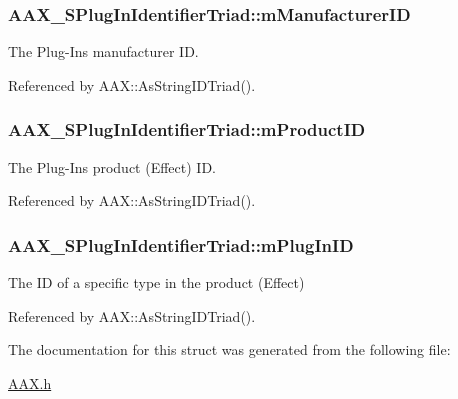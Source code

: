 \subsubsection[{m\+Manufacturer\+I\+D}]{ A\+A\+X\+\_\+\+S\+Plug\+In\+Identifier\+Triad\+::m\+Manufacturer\+I\+D}\label{a00127_a996b416626b2bb8bec10294b63579d91}


The Plug-\/\+In\textquotesingle{}s manufacturer I\+D. 



Referenced by A\+A\+X\+::\+As\+String\+I\+D\+Triad().

\hypertarget{a00127_a68e6bc6c424a7eabe04d52fe47c2a006}{}
\subsubsection[{m\+Product\+I\+D}]{ A\+A\+X\+\_\+\+S\+Plug\+In\+Identifier\+Triad\+::m\+Product\+I\+D}\label{a00127_a68e6bc6c424a7eabe04d52fe47c2a006}


The Plug-\/\+In\textquotesingle{}s product (Effect) I\+D. 



Referenced by A\+A\+X\+::\+As\+String\+I\+D\+Triad().

\hypertarget{a00127_a7554a514df9e97e8a7c8e416165f2f59}{}
\subsubsection[{m\+Plug\+In\+I\+D}]{ A\+A\+X\+\_\+\+S\+Plug\+In\+Identifier\+Triad\+::m\+Plug\+In\+I\+D}\label{a00127_a7554a514df9e97e8a7c8e416165f2f59}


The I\+D of a specific type in the product (Effect) 



Referenced by A\+A\+X\+::\+As\+String\+I\+D\+Triad().



The documentation for this struct was generated from the following file\+:\begin{DoxyCompactItemize}
\item 
\hyperlink{a00149}{A\+A\+X.\+h}\end{DoxyCompactItemize}
